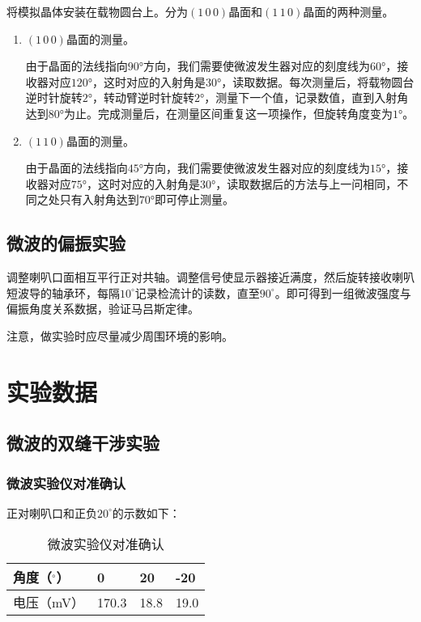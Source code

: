 \documentclass[11pt]{article}
\begin{document}
将模拟晶体安装在载物圆台上。分为$(1\,0\,0)$晶面和$(1\,1\,0)$晶面的两种测量。

\begin{enumerate}
  \item $(1\,0\,0)$晶面的测量。
  
  由于晶面的法线指向$90$°方向，我们需要使微波发生器对应的刻度线为$60$°，接收器对应$120$°，这时对应的入射角是$30$°，读取数据。每次测量后，将载物圆台逆时针旋转$2$°，转动臂逆时针旋转$2$°，测量下一个值，记录数值，直到入射角达到$80$°为止。完成测量后，在测量区间重复这一项操作，但旋转角度变为$1$°。
  
  \item $(1\,1\,0)$晶面的测量。
  
  由于晶面的法线指向$45$°方向，我们需要使微波发生器对应的刻度线为$15$°，接收器对应$75$°，这时对应的入射角是$30$°，读取数据后的方法与上一问相同，不同之处只有入射角达到$70$°即可停止测量。

\end{enumerate}

\subsection{微波的偏振实验}

调整喇叭口面相互平行正对共轴。调整信号使显示器接近满度，然后旋转接收喇叭短波导的轴承环，每隔$10 ^\circ$记录检流计的读数，直至$90 ^\circ$。即可得到一组微波强度与偏振角度关系数据，验证马吕斯定律。

注意，做实验时应尽量减少周围环境的影响。

\section{实验数据}

\subsection{微波的双缝干涉实验}

\subsubsection{微波实验仪对准确认}

正对喇叭口和正负$20^\circ$的示数如下：

\begin{table}[H]
  \centering
	\begin{tabular}{|l|l|l|l|}
		\hline
		角度（$^\circ$）   & 0     & 20   & -20  \\ \hline
		电压（mV） & 170.3 & 18.8 & 19.0 \\ \hline
	\end{tabular}
  \caption{微波实验仪对准确认}
\end{table}
\end{document}
